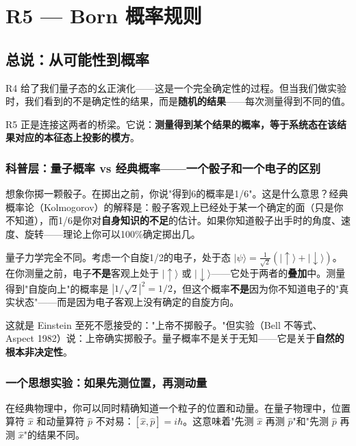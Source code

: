 \chapter{R5 — Born 概率规则}
\label{ch:r5}

\section{总说：从可能性到概率}

R4 给了我们量子态的幺正演化——这是一个完全确定性的过程。但当我们做实验时，我们看到的不是确定性的结果，而是\textbf{随机的结果}——每次测量得到不同的值。

R5 正是连接这两者的桥梁。它说：\textbf{测量得到某个结果的概率，等于系统态在该结果对应的本征态上投影的模方}。

\subsection{科普层：量子概率 vs 经典概率——一个骰子和一个电子的区别}

想象你掷一颗骰子。在掷出之前，你说"得到6的概率是1/6"。这是什么意思？经典概率论（Kolmogorov）的解释是：骰子客观上已经处于某一个确定的面（只是你不知道），而1/6是你对\textbf{自身知识的不足}的估计。如果你知道骰子出手时的角度、速度、旋转——理论上你可以100\%确定掷出几。

量子力学完全不同。考虑一个自旋1/2的电子，处于态 $|\psi\rangle = \frac{1}{\sqrt{2}}(|\!\uparrow\rangle + |\!\downarrow\rangle)$。在你测量之前，电子\textbf{不是}客观上处于 $|\!\uparrow\rangle$ 或 $|\!\downarrow\rangle$——它处于两者的\textbf{叠加}中。测量得到"自旋向上"的概率是 $|1/\sqrt{2}|^2 = 1/2$，但这个概率\textbf{不是}因为你不知道电子的"真实状态"——而是因为电子客观上没有确定的自旋方向。

这就是 Einstein 至死不愿接受的："上帝不掷骰子。"但实验（Bell 不等式、Aspect 1982）说：上帝确实掷骰子。量子概率不是关于无知——它是关于\textbf{自然的根本非决定性}。

\subsection{一个思想实验：如果先测位置，再测动量}

在经典物理中，你可以同时精确知道一个粒子的位置和动量。在量子物理中，位置算符 $\hat{x}$ 和动量算符 $\hat{p}$ 不对易：$[\hat{x},\hat{p}] = i\hbar$。这意味着"先测 $\hat{x}$ 再测 $\hat{p}$"和"先测 $\hat{p}$ 再测 $\hat{x}$"的结果不同。

